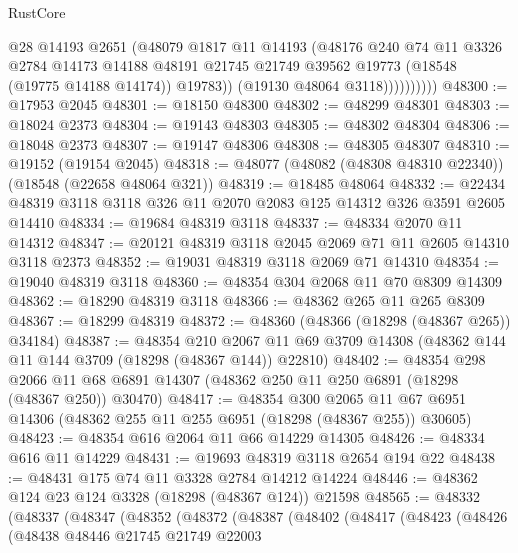 \begin{lexlean}{RustCore}
\begin{coremodule}
                      @28
                      @14193
                      @2651
                      (@48079
                        @1817
                        @11
                        @14193
                        (@48176
                          @240
                          @74
                          @11
                          @3326
                          @2784
                          @14173
                          @14188
                          @48191
                          @21745
                          @21749
                          @39562
                          @19773
                          (@18548 (@19775 @14188 @14174))
                          @19783))
                      (@19130 @48064 @3118))))))))))
@48300 := @17953 @2045
@48301 := @18150 @48300
@48302 := @48299 @48301
@48303 := @18024 @2373
@48304 := @19143 @48303
@48305 := @48302 @48304
@48306 := @18048 @2373
@48307 := @19147 @48306
@48308 := @48305 @48307
@48310 := @19152 (@19154 @2045)
@48318 := @48077 (@48082 (@48308 @48310 @22340)) (@18548 (@22658 @48064 @321))
@48319 := @18485 @48064
@48332 := @22434 @48319 @3118 @3118 @326 @11 @2070 @2083 @125 @14312 @326 @3591 @2605 @14410
@48334 := @19684 @48319 @3118
@48337 := @48334 @2070 @11 @14312
@48347 := @20121 @48319 @3118 @2045 @2069 @71 @11 @2605 @14310 @3118 @2373
@48352 := @19031 @48319 @3118 @2069 @71 @14310
@48354 := @19040 @48319 @3118
@48360 := @48354 @304 @2068 @11 @70 @8309 @14309
@48362 := @18290 @48319 @3118
@48366 := @48362 @265 @11 @265 @8309
@48367 := @18299 @48319
@48372 := @48360 (@48366 (@18298 (@48367 @265)) @34184)
@48387 := @48354
    @210
    @2067
    @11
    @69
    @3709
    @14308
    (@48362 @144 @11 @144 @3709 (@18298 (@48367 @144)) @22810)
@48402 := @48354
    @298
    @2066
    @11
    @68
    @6891
    @14307
    (@48362 @250 @11 @250 @6891 (@18298 (@48367 @250)) @30470)
@48417 := @48354
    @300
    @2065
    @11
    @67
    @6951
    @14306
    (@48362 @255 @11 @255 @6951 (@18298 (@48367 @255)) @30605)
@48423 := @48354 @616 @2064 @11 @66 @14229 @14305
@48426 := @48334 @616 @11 @14229
@48431 := @19693 @48319 @3118 @2654 @194 @22
@48438 := @48431 @175 @74 @11 @3328 @2784 @14212 @14224
@48446 := @48362 @124 @23 @124 @3328 (@18298 (@48367 @124)) @21598
@48565 := @48332
    (@48337
      (@48347
        (@48352
          (@48372
            (@48387
              (@48402
                (@48417
                  (@48423
                    (@48426
                      (@48438
                        @48446
                        @21745
                        @21749
                        @22003

\end{coremodule}
\end{lexlean}
